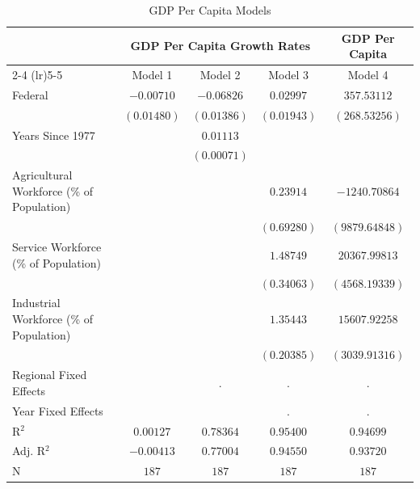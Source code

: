 
\begin{table}
\caption{GDP Per Capita Models}
\begin{center}
\begin{tabular}{l c c c c}
\toprule
 & \multicolumn{3}{c}{GDP Per Capita Growth Rates} & \multicolumn{1}{c}{GDP Per Capita} \\
\cmidrule(lr){2-4} \cmidrule(lr){5-5}
 & Model 1 & Model 2 & Model 3 & Model 4 \\
\midrule
Federal                                   & $-0.00710$  & $-0.06826$  & $0.02997$   & $357.53112$    \\
                                          & $(0.01480)$ & $(0.01386)$ & $(0.01943)$ & $(268.53256)$  \\
Years Since 1977                          &             & $0.01113$   &             &                \\
                                          &             & $(0.00071)$ &             &                \\
Agricultural Workforce (\% of Population) &             &             & $0.23914$   & $-1240.70864$  \\
                                          &             &             & $(0.69280)$ & $(9879.64848)$ \\
Service Workforce (\% of Population)      &             &             & $1.48749$   & $20367.99813$  \\
                                          &             &             & $(0.34063)$ & $(4568.19339)$ \\
Industrial Workforce (\% of Population)   &             &             & $1.35443$   & $15607.92258$  \\
                                          &             &             & $(0.20385)$ & $(3039.91316)$ \\
\midrule
Regional Fixed Effects                    &             & .           & .           & .              \\
Year Fixed Effects                        &             &             & .           & .              \\
R$^2$                                     & $0.00127$   & $0.78364$   & $0.95400$   & $0.94699$      \\
Adj. R$^2$                                & $-0.00413$  & $0.77004$   & $0.94550$   & $0.93720$      \\
N                                         & $187$       & $187$       & $187$       & $187$          \\
\bottomrule
\end{tabular}
\label{}
\end{center}
\end{table}
